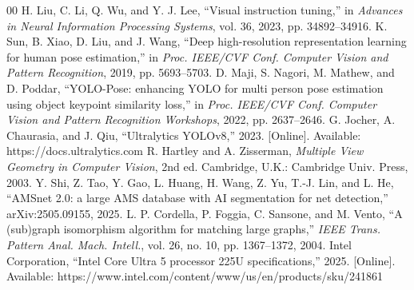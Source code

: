 \documentclass[conference]{IEEEtran}
\begin{document}
\begin{thebibliography}{00}
 H. Liu, C. Li, Q. Wu, and Y. J. Lee, ``Visual instruction
tuning,'' in \emph{Advances in Neural Information Processing Systems}, vol. 36,
2023, pp. 34892--34916.
 K. Sun, B. Xiao, D. Liu, and J. Wang, ``Deep high-resolution
representation learning for human pose estimation,'' in \emph{Proc. IEEE/CVF
Conf. Computer Vision and Pattern Recognition}, 2019, pp. 5693--5703.
 D. Maji, S. Nagori, M. Mathew, and D. Poddar, ``YOLO-Pose:
enhancing YOLO for multi person pose estimation using object keypoint similarity
loss,'' in \emph{Proc. IEEE/CVF Conf. Computer Vision and Pattern Recognition
Workshops}, 2022, pp. 2637--2646.
 G. Jocher, A. Chaurasia, and J. Qiu, ``Ultralytics YOLOv8,''
2023. [Online]. Available: https://docs.ultralytics.com
 R. Hartley and A. Zisserman, \emph{Multiple View Geometry in
Computer Vision}, 2nd ed. Cambridge, U.K.: Cambridge Univ. Press, 2003.
 Y. Shi, Z. Tao, Y. Gao, L. Huang, H. Wang, Z. Yu, T.-J. Lin,
and L. He, ``AMSnet 2.0: a large AMS database
with AI segmentation for net detection,'' arXiv:2505.09155, 2025.
 L. P. Cordella, P. Foggia, C. Sansone, and M. Vento, ``A
(sub)graph isomorphism algorithm for matching large graphs,'' \emph{IEEE Trans.
Pattern Anal. Mach. Intell.}, vol. 26, no. 10, pp. 1367--1372, 2004.
 Intel Corporation, ``Intel Core Ultra 5 processor 225U
specifications,'' 2025. [Online]. Available:
https://www.intel.com/content/www/us/en/products/sku/241861
\end{thebibliography}
\end{document}
